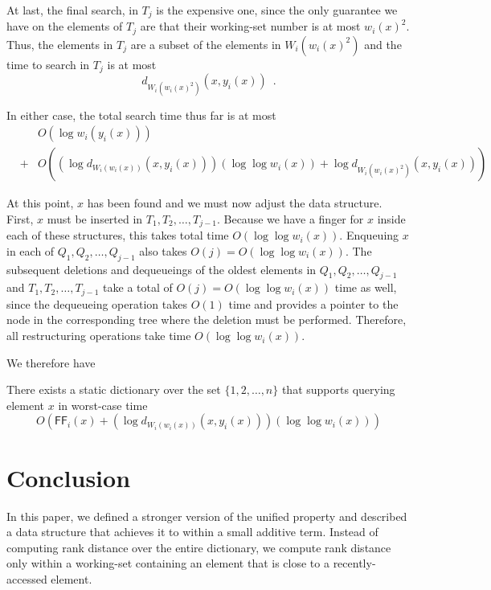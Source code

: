 \documentclass{llncs}
\newcommand{\BigOh}[1]{O\!\left(#1\right)}
\newcommand{\SU}[1]{\textsf{FF}_i\!\left(#1\right)}
\begin{document}
At last, the final search, in $T_j$ is the expensive one, since the only
guarantee we have on the elements of $T_j$ are that their working-set number
is at most $w_i(x)^2$.  Thus, the elements in $T_j$ are a subset of the elements in $W_i(w_i(x)^2)$ and the time to search in $T_j$ is at most
\[
    d_{W_i(w_i(x)^2)}(x,y_i(x)) \enspace .
\]

In either case, the total search time thus far is at most 
\begin{eqnarray*}
&&\BigOh{\log w_i(y_i(x))}\\&+& \BigOh{(\log d_{W_i(w_i(x))}(x,y_i(x)))(\log \log w_i(x)) + \log d_{W_i(w_i(x)^2)}(x,y_i(x))}
\end{eqnarray*}

At this point, $x$ has been found and we must now adjust the data structure. First, $x$ must be inserted in $T_1,T_2,\ldots,T_{j-1}$. Because we have a finger for $x$ inside each of these structures, this takes total time $\BigOh{\log \log w_i(x)}$. Enqueuing $x$ in each of $Q_1,Q_2,\ldots,Q_{j-1}$ also takes $\BigOh{j} = \BigOh{\log \log w_i(x)}$. The subsequent deletions and dequeueings of the oldest elements in $Q_1,Q_2,\ldots,Q_{j-1}$ and $T_1,T_2,\ldots,T_{j-1}$ take a total of $\BigOh{j} = \BigOh{\log \log w_i(x)}$ time as well, since the dequeueing operation takes $\BigOh{1}$ time and provides a pointer to the node in the corresponding tree where the deletion must be performed. Therefore, all restructuring operations take time $\BigOh{\log \log w_i(x)}$.

We therefore have

\begin{theorem}
\label{theorem:main}
There exists a static dictionary over the set $\{1,2,\ldots,n\}$ that supports querying element $x$ in worst-case time
\begin{displaymath}
\BigOh{\SU{x} + (\log d_{W_i(w_i(x))}(x,y_i(x)))(\log \log w_i(x))}
\end{displaymath}
\end{theorem}
	
\section{Conclusion}
\label{section:conclusion}

In this paper, we defined a stronger version of the unified property and described a data structure that achieves it to within a small additive term. Instead of computing rank distance over the entire dictionary, we compute rank distance only within a working-set containing an element that is close to a recently-accessed element.
\end{document}

